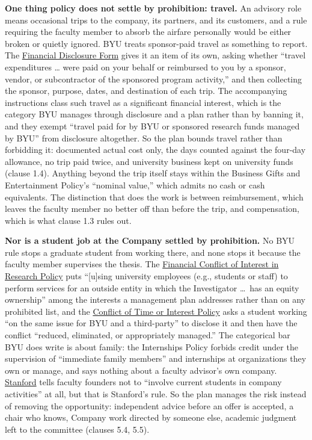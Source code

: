 \documentclass[11pt]{article}
\begin{document}
\noindent \textbf{One thing policy does not settle by prohibition: travel.} An
advisory role means occasional trips to the company, its partners, and its
customers, and a rule requiring the faculty member to absorb the airfare
personally would be either broken or quietly ignored. BYU treats sponsor-paid
travel as something to report. The
\href{https://spo.byu.edu/policies}{Financial Disclosure Form} gives it an item
of its own, asking whether ``travel expenditures \ldots{} were paid on your
behalf or reimbursed to you by a sponsor, vendor, or subcontractor of the
sponsored program activity,'' and then collecting the sponsor, purpose, dates,
and destination of each trip. The accompanying instructions class such travel
as a significant financial interest, which is the category BYU manages through
disclosure and a plan rather than by banning it, and they exempt ``travel paid
for by BYU or sponsored research funds managed by BYU'' from disclosure
altogether. So the plan bounds travel rather than forbidding it: documented
actual cost only, the days counted against the four-day allowance, no trip paid
twice, and university business kept on university funds (clause 1.4). Anything
beyond the trip itself stays within the Business Gifts and Entertainment
Policy's ``nominal value,'' which admits no cash or cash equivalents. The
distinction that does the work is between reimbursement, which leaves the
faculty member no better off than before the trip, and compensation, which is
what clause 1.3 rules out.

\noindent \textbf{Nor is a student job at the Company settled by prohibition.}
No BYU rule stops a graduate student from working there, and none stops it
because the faculty member supervises the thesis. The
\href{https://policy.byu.edu/view/financial-conflict-of-interest-in-research-policy}{Financial
Conflict of Interest in Research Policy} puts ``[u]sing university employees
(e.g., students or staff) to perform services for an outside entity in which
the Investigator \ldots\ has an equity ownership'' among the interests a
management plan addresses rather than on any prohibited list, and the
\href{https://policy.byu.edu/view/conflict-of-time-or-interest-policy}{Conflict
of Time or Interest Policy} asks a student working ``on the same issue for BYU
and a third-party'' to disclose it and then have the conflict ``reduced,
eliminated, or appropriately managed.'' The categorical bar BYU does write is
about family: the Internships Policy forbids credit under the supervision of
``immediate family members'' and internships at organizations they own or
manage, and says nothing about a faculty advisor's own company.
\href{https://web.stanford.edu/group/OTL/documents/bp_faculty_sus.pdf}{Stanford}
tells faculty founders not to ``involve current students in company
activities'' at all, but that is Stanford's rule. So the plan manages the risk
instead of removing the opportunity: independent advice before an offer is
accepted, a chair who knows, Company work directed by someone else, academic
judgment left to the committee (clauses 5.4, 5.5).
\end{document}
